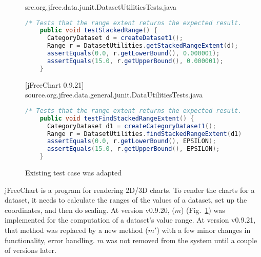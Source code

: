 \begin{figure}[t]
\scriptsize
\centering
[jFreeChart 0.9.20] src.org.jfree.data.junit.DatasetUtilitiesTests.java
\begin{lstlisting}[language=Java, emph={getStackedRangeExtent}]
    /* Tests that the range extent returns the expected result. */
    public void testStackedRange() {
      CategoryDataset d = createDataset1();
      Range r = DatasetUtilities.getStackedRangeExtent(d);
      assertEquals(0.0, r.getLowerBound(), 0.000001);
      assertEquals(15.0, r.getUpperBound(), 0.000001);
    }
\end{lstlisting}
[jFreeChart 0.9.21] source.org.jfree.data.general.junit.DataUtilitiesTests.java
\begin{lstlisting}[language=Java, emph={findStackedRangeExtent}]
    /* Tests that the range extent returns the expected result. */
    public void testFindStackedRangeExtent() {
      CategoryDataset d1 = createCategoryDataset1();
      Range r = DatasetUtilities.findStackedRangeExtent(d1);
      assertEquals(0.0, r.getLowerBound(), EPSILON);
      assertEquals(15.0, r.getUpperBound(), EPSILON);
    }
\end{lstlisting}
\caption{Existing test case was adapted}
\label{example1test}
\end{figure}



jFreeChart is a program for rendering 2D/3D charts. To render the
charts for a dataset, it needs to calculate the ranges of the values
of a dataset, set up the coordinates, and then do scaling. At version
v0.9.20,
 ($m$)
(Fig.~\ref{example1test}) was implemented for the computation of a
dataset's value range. At version v0.9.21, that method was replaced by
a new method
 ($m'$)
with a few minor changes in functionality, \eg error handling. $m$
was not removed from the system until a couple of versions later.

